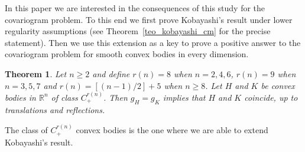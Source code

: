 \documentclass[a4paper]{amsart}
\newtheorem{theorem}{Theorem}[section]
\theoremstyle{definition}
\numberwithin{equation}{section}
\begin{document}
In this paper we are interested in the consequences of this study for the covariogram problem. To this end we first prove Kobayashi's result under lower regularity assumptions (see Theorem~\ref{teo_kobayashi_cm} for the precise statement). Then we use this extension  as a key to prove a positive answer to the covariogram problem for smooth convex bodies in every dimension.
\begin{theorem}\label{teo_cov_smooth}Let $n\geq 2$ and define ${{r(n)}}=8$ when $n=2,4,6$, ${{r(n)}}=9$ when $n=3,5,7$
and ${{r(n)}}=[(n-1)/2]+5$ when $n\geq8$. Let $H$ and $K$  be  convex bodies in ${\mathbb{R}}^n$ of class $C^{{r(n)}}_+$. Then $g_H=g_K$ implies that $H$ and $K$ coincide, up to translations and reflections.
\end{theorem}
The class of $C^{{r(n)}}_+$ convex bodies is the one where we are able to extend Kobayashi's result.
\end{document}

